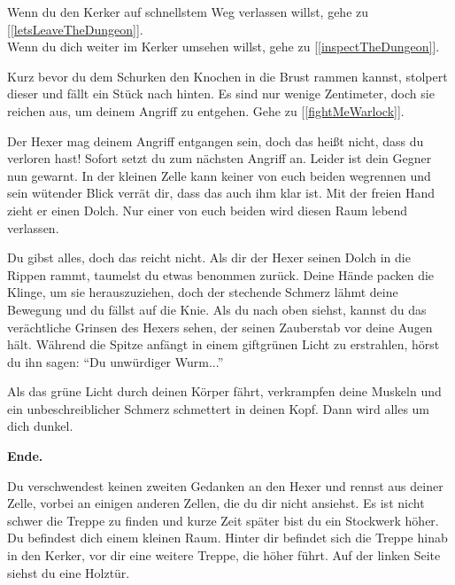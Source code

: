 Wenn du den Kerker auf schnellstem Weg verlassen willst, gehe zu [\ref{letsLeaveTheDungeon}].
\\Wenn du dich weiter im Kerker umsehen willst, gehe zu [\ref{inspectTheDungeon}].


Kurz bevor du dem Schurken den Knochen in die Brust rammen kannst, stolpert dieser und fällt ein Stück nach hinten. Es sind nur wenige Zentimeter, doch sie reichen aus, um deinem Angriff zu entgehen. Gehe zu [\ref{fightMeWarlock}].


Der Hexer mag deinem Angriff entgangen sein, doch das heißt nicht, dass du verloren hast! Sofort setzt du zum nächsten Angriff an. Leider ist dein Gegner nun gewarnt. In der kleinen Zelle kann keiner von euch beiden wegrennen und sein wütender Blick verrät dir, dass das auch ihm klar ist. Mit der freien Hand zieht er einen Dolch. Nur einer von euch beiden wird diesen Raum lebend verlassen.



Du gibst alles, doch das reicht nicht. Als dir der Hexer seinen Dolch in die Rippen rammt, taumelst du etwas benommen zurück. Deine Hände packen die Klinge, um sie herauszuziehen, doch der stechende Schmerz lähmt deine Bewegung und du fällst auf die Knie. Als du nach oben siehst, kannst du das verächtliche Grinsen des Hexers sehen, der seinen Zauberstab vor deine Augen hält. Während die Spitze anfängt in einem giftgrünen Licht zu erstrahlen, hörst du ihn sagen: ``Du unwürdiger Wurm...''

Als das grüne Licht durch deinen Körper fährt, verkrampfen deine Muskeln und ein unbeschreiblicher Schmerz schmettert in deinen Kopf. Dann wird alles um dich dunkel.

\textbf{Ende.}


Du verschwendest keinen zweiten Gedanken an den Hexer und rennst aus deiner Zelle, vorbei an einigen anderen Zellen, die du dir nicht ansiehst. Es ist nicht schwer die Treppe zu finden und kurze Zeit später bist du ein Stockwerk höher. Du befindest dich einem kleinen Raum. Hinter dir befindet sich die Treppe hinab in den Kerker, vor dir eine weitere Treppe, die höher führt. Auf der linken Seite siehst du eine Holztür.


